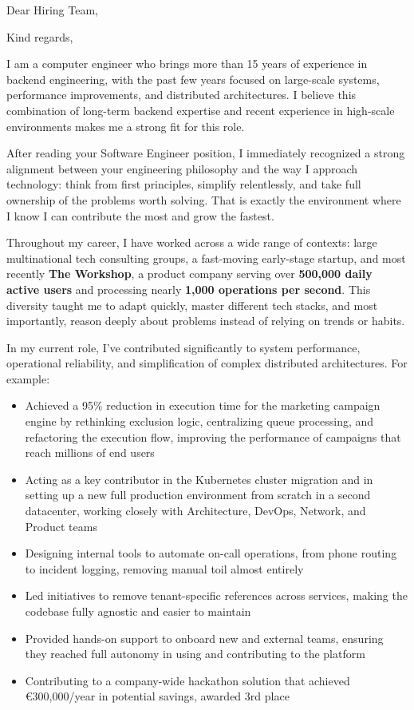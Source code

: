 \documentclass[11pt,a4paper,sans]{moderncv}
\begin{document}
\date{December 10th, 2025}
\subject{Software Engineer}
\opening{Dear Hiring Team,}
\closing{Kind regards,}

\makelettertitle

\begin{justify}
I am a computer engineer who brings more than 15 years of experience in backend engineering, with the past few years focused on large-scale systems, performance improvements, and distributed architectures. I believe this combination of long-term backend expertise and recent experience in high-scale environments makes me a strong fit for this role.

After reading your Software Engineer position, I immediately recognized a strong alignment between your engineering philosophy and the way I approach technology: think from first principles, simplify relentlessly, and take full ownership of the problems worth solving. That is exactly the environment where I know I can contribute the most and grow the fastest.

Throughout my career, I have worked across a wide range of contexts: large multinational tech consulting groups, a fast-moving early-stage startup, and most recently \textbf{The Workshop}, a product company serving over \textbf{500,000 daily active users} and processing nearly \textbf{1,000 operations per second}. This diversity taught me to adapt quickly, master different tech stacks, and most importantly, reason deeply about problems instead of relying on trends or habits.

In my current role, I've contributed significantly to system performance, operational reliability, and simplification of complex distributed architectures. For example:

\begin{itemize}
\item Achieved a 95\% reduction in execution time for the marketing campaign engine by rethinking exclusion logic, centralizing queue processing, and refactoring the execution flow, improving the performance of campaigns that reach millions of end users
\item Acting as a key contributor in the Kubernetes cluster migration and in setting up a new full production environment from scratch in a second datacenter, working closely with Architecture, DevOps, Network, and Product teams
\item Designing internal tools to automate on-call operations, from phone routing to incident logging, removing manual toil almost entirely
\item Led initiatives to remove tenant-specific references across services, making the codebase fully agnostic and easier to maintain
\item Provided hands-on support to onboard new and external teams, ensuring they reached full autonomy in using and contributing to the platform
\item Contributing to a company-wide hackathon solution that achieved €300,000/year in potential savings, awarded 3rd place
\end{itemize}


\end{justify}
\end{document}
